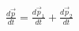 \documentclass[preview]{standalone}
\begin{document}
\begin{align*}
{\frac {d{\vec {p}}}{dt}}={\frac {d{\vec {p}}_{1}}{dt}}+{\frac {d{\vec {p}}_{2}}{dt}}
\end{align*}
\end{document}
